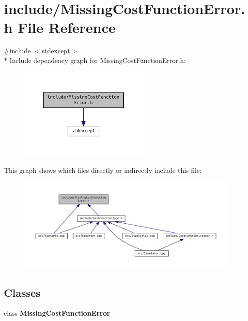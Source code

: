 \section{include/\+Missing\+Cost\+Function\+Error.h File Reference}
\label{_missing_cost_function_error_8h}
{\ttfamily \#include $<$stdexcept$>$}\\*
Include dependency graph for Missing\+Cost\+Function\+Error.\+h\+:
\nopagebreak
\begin{figure}[H]
\begin{center}
\leavevmode
\includegraphics[width=187pt]{_missing_cost_function_error_8h__incl}
\end{center}
\end{figure}
This graph shows which files directly or indirectly include this file\+:
\nopagebreak
\begin{figure}[H]
\begin{center}
\leavevmode
\includegraphics[width=350pt]{_missing_cost_function_error_8h__dep__incl}
\end{center}
\end{figure}
\subsection*{Classes}
\begin{DoxyCompactItemize}
\item 
class {\bf Missing\+Cost\+Function\+Error}
\end{DoxyCompactItemize}
